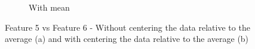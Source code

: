 \begin{enumerate}
\begin{figure}[t]
\begin{subfigure}[b]{0.4\linewidth}
            \caption{With mean}
            \label{fig:feature5vs6b}
        \end{subfigure}
        \caption{Feature 5 vs Feature 6 - Without centering the data relative to the average (a)
            and with centering the data relative to the average (b)}
        \label{fig:feature5vs6}
    \end{figure}

\end{enumerate}